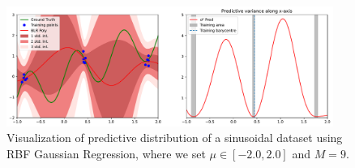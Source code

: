 \begin{figure}[H]
    \centering
    \includegraphics[width=0.95\textwidth]{phi_gaussian_hole_modified_distance.pdf}
    \caption{Visualization of predictive distribution of a sinusoidal dataset using RBF Gaussian Regression, where we set $\mu \in [-2.0, 2.0]$ and $M = 9$.}
    \label{fig:phi_gaussian_hole_modified_distance}
\end{figure}